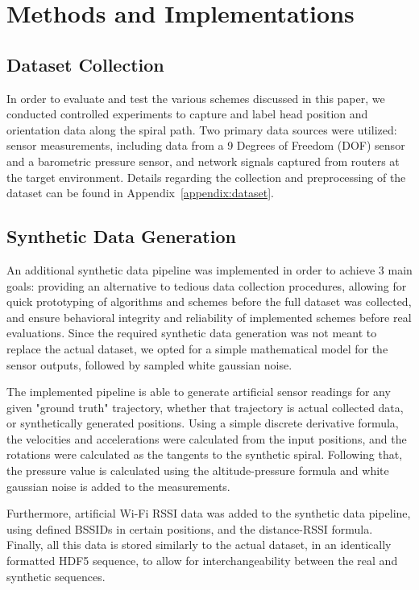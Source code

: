 \chapter{Methods and Implementations}

\section{Dataset Collection}
In order to evaluate and test the various schemes discussed in this paper, we conducted controlled experiments to capture and label head position and orientation data along the spiral path. Two primary data sources were utilized: sensor measurements, including data from a 9 Degrees of Freedom (DOF) sensor and a barometric pressure sensor, and network signals captured from routers at the target environment. Details regarding the collection and preprocessing of the dataset can be found in Appendix~\ref{appendix:dataset}.

\section{Synthetic Data Generation}
An additional synthetic data pipeline was implemented in order to achieve 3 main goals: providing an alternative to tedious data collection procedures, allowing for quick prototyping of algorithms and schemes before the full dataset was collected, and ensure behavioral integrity and reliability of implemented schemes before real evaluations. Since the required synthetic data generation was not meant to replace the actual dataset, we opted for a simple mathematical model for the sensor outputs, followed by sampled white gaussian noise.
\par
The implemented pipeline is able to generate artificial sensor readings for any given "ground truth" trajectory, whether that trajectory is actual collected data, or synthetically generated positions. Using a simple discrete derivative formula, the velocities and accelerations were calculated from the input positions, and the rotations were calculated as the tangents to the synthetic spiral. Following that, the pressure value is calculated using the altitude-pressure formula \cite{barometric} and white gaussian noise is added to the measurements.
\par
Furthermore, artificial Wi-Fi RSSI data was added to the synthetic data pipeline, using defined BSSIDs in certain positions, and the distance-RSSI formula. \cite{shang_2014_a} Finally, all this data is stored similarly to the actual dataset, in an identically formatted HDF5 sequence, to allow for interchangeability between the real and synthetic sequences.



